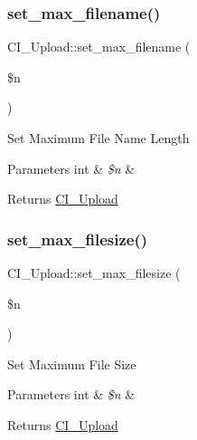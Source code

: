 \subsubsection{\texorpdfstring{set\+\_\+max\+\_\+filename()}{set\_max\_filename()}}
{\footnotesize\ttfamily C\+I\+\_\+\+Upload\+::set\+\_\+max\+\_\+filename (\begin{DoxyParamCaption}\item[{}]{\$n }\end{DoxyParamCaption})}

Set Maximum File Name Length


\begin{DoxyParams}[1]{Parameters}
int & {\em \$n} & \\
\hline
\end{DoxyParams}
\begin{DoxyReturn}{Returns}
\mbox{\hyperlink{class_c_i___upload}{C\+I\+\_\+\+Upload}} 
\end{DoxyReturn}
\mbox{\label{class_c_i___upload_a39c5a916b1ae99355bccaf4db056a30e}} 
\subsubsection{\texorpdfstring{set\+\_\+max\+\_\+filesize()}{set\_max\_filesize()}}
{\footnotesize\ttfamily C\+I\+\_\+\+Upload\+::set\+\_\+max\+\_\+filesize (\begin{DoxyParamCaption}\item[{}]{\$n }\end{DoxyParamCaption})}

Set Maximum File Size


\begin{DoxyParams}[1]{Parameters}
int & {\em \$n} & \\
\hline
\end{DoxyParams}
\begin{DoxyReturn}{Returns}
\mbox{\hyperlink{class_c_i___upload}{C\+I\+\_\+\+Upload}} 
\end{DoxyReturn}
\mbox{\label{class_c_i___upload_ab1a749e824f5f94e22258dea17d06139}} 
